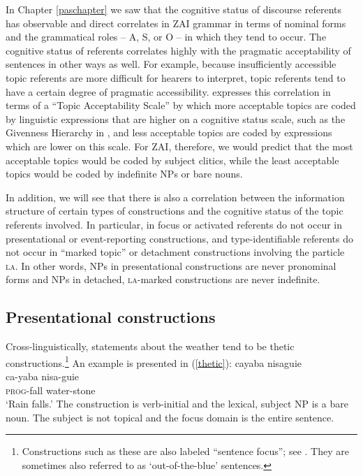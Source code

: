 In Chapter \ref{paschapter} we saw that the cognitive status of discourse referents has observable and direct correlates in ZAI grammar in terms of nominal forms and the grammatical roles -- A, S, or O -- in which they tend to occur. The cognitive status of referents correlates highly with the pragmatic acceptability of sentences in other ways as well. For example, because insufficiently accessible topic referents are more difficult for hearers to interpret, topic referents tend to have a certain degree of pragmatic accessibility. \citet[165]{lambrecht1994} expresses this correlation in terms of a ``Topic Acceptability Scale'' by which more acceptable topics are coded by linguistic expressions that are higher on a cognitive status scale, such as the Givenness Hierarchy in , and less acceptable topics are coded by expressions which are lower on this scale. For ZAI, therefore, we would predict that the most acceptable topics would be coded by subject clitics, while the least acceptable topics would be coded by indefinite NPs or bare nouns.

In addition, we will see that there is also a correlation between the information structure of certain types of constructions and the cognitive status of the topic referents involved. In particular, in focus or activated referents do not occur in presentational or event-reporting constructions, and type-identifiable referents do not occur in ``marked topic'' or detachment constructions involving the particle \textsc{la}. In other words, NPs in presentational constructions are never pronominal forms and NPs in detached, \textsc{la}-marked constructions are never indefinite. 



\subsection{Presentational constructions}\label{presentationalsection}

Cross-linguistically, statements about the weather tend to be thetic constructions.\footnote{Constructions such as these are also labeled ``sentence focus''; see . They are sometimes also referred to as `out-of-the-blue' sentences.} An example is presented in (\ref{thetic}):
\ea\label{thetic} 
\glll cayaba nisaguie \\
ca-yaba nisa-guie \\
\textsc{prog}-fall water-stone  \\
\glt `Rain falls.' 
\z
The construction is verb-initial and the lexical, subject NP is a bare noun. The subject is not topical and the focus domain is the entire sentence.

